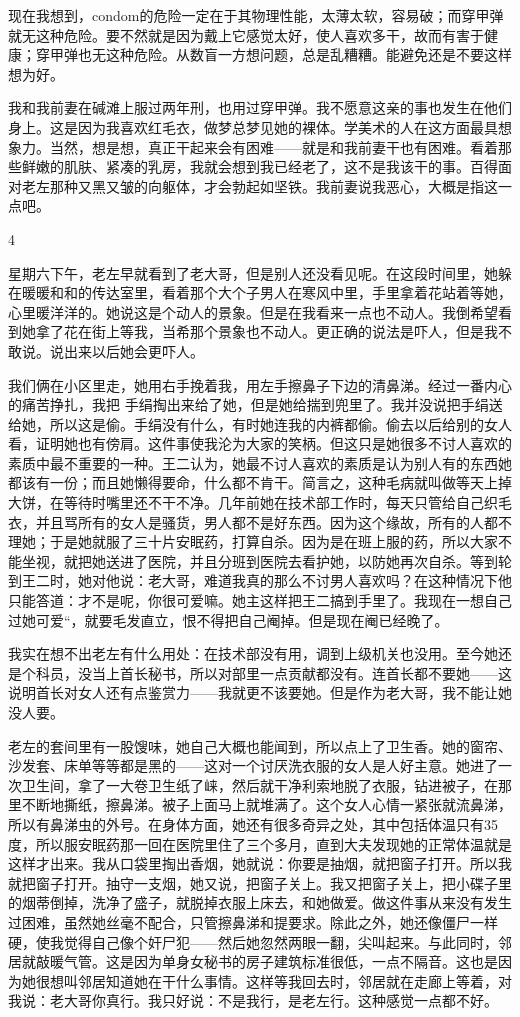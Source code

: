 现在我想到，condom的危险一定在于其物理性能，太薄太软，容易破；而穿甲弹就无这种危险。要不然就是因为戴上它感觉太好，使人喜欢多干，故而有害于健康；穿甲弹也无这种危险。从数盲一方想问题，总是乱糟糟。能避免还是不要这样想为好。 

我和我前妻在碱滩上服过两年刑，也用过穿甲弹。我不愿意这亲的事也发生在他们身上。这是因为我喜欢红毛衣，做梦总梦见她的裸体。学美术的人在这方面最具想象力。当然，想是想，真正干起来会有困难——就是和我前妻干也有困难。看着那些鲜嫩的肌肤、紧凑的乳房，我就会想到我已经老了，这不是我该干的事。百得面对老左那种又黑又皱的向躯体，才会勃起如坚铁。我前妻说我恶心，大概是指这一点吧。 



4 

星期六下午，老左早就看到了老大哥，但是别人还没看见呢。在这段时间里，她躲在暖暖和和的传达室里，看着那个大个子男人在寒风中里，手里拿着花站着等她，心里暖洋洋的。她说这是个动人的景象。但是在我看来一点也不动人。我倒希望看到她拿了花在街上等我，当希那个景象也不动人。更正确的说法是吓人，但是我不敢说。说出来以后她会更吓人。 

我们俩在小区里走，她用右手挽着我，用左手擦鼻子下边的清鼻涕。经过一番内心的痛苦挣扎，我把 手绢掏出来给了她，但是她给揣到兜里了。我并没说把手绢送给她，所以这是偷。手绢没有什么，有时她连我的内裤都偷。偷去以后给别的女人看，证明她也有傍肩。这件事使我沦为大家的笑柄。但这只是她很多不讨人喜欢的素质中最不重要的一种。王二认为，她最不讨人喜欢的素质是认为别人有的东西她都该有一份；而且她懒得要命，什么都不肯干。简言之，这种毛病就叫做等天上掉大饼，在等待时嘴里还不干不净。几年前她在技术部工作时，每天只管给自己织毛衣，并且骂所有的女人是骚货，男人都不是好东西。因为这个缘故，所有的人都不理她；于是她就服了三十片安眠药，打算自杀。因为是在班上服的药，所以大家不能坐视，就把她送进了医院，并且分班到医院去看护她，以防她再次自杀。等到轮到王二时，她对他说：老大哥，难道我真的那么不讨男人喜欢吗？在这种情况下他只能答道：才不是呢，你很可爱嘛。她主这样把王二搞到手里了。我现在一想自己过她可爱“，就要毛发直立，恨不得把自己阉掉。但是现在阉已经晚了。 

我实在想不出老左有什么用处：在技术部没有用，调到上级机关也没用。至今她还是个科员，没当上首长秘书，所以对部里一点贡献都没有。连首长都不要她——这说明首长对女人还有点鉴赏力——我就更不该要她。但是作为老大哥，我不能让她没人要。 

老左的套间里有一股馊味，她自己大概也能闻到，所以点上了卫生香。她的窗帘、沙发套、床单等等都是黑的——这对一个讨厌洗衣服的女人是人好主意。她进了一次卫生间，拿了一大卷卫生纸了崃，然后就干净利索地脱了衣服，钻进被子，在那里不断地撕纸，擦鼻涕。被子上面马上就堆满了。这个女人心情一紧张就流鼻涕，所以有鼻涕虫的外号。在身体方面，她还有很多奇异之处，其中包括体温只有35度，所以服安眠药那一回在医院里住了三个多月，直到大夫发现她的正常体温就是这样才出来。我从口袋里掏出香烟，她就说：你要是抽烟，就把窗子打开。所以我就把窗子打开。抽守一支烟，她又说，把窗子关上。我又把窗子关上，把小碟子里的烟蒂倒掉，洗净了盛子，就脱掉衣服上床去，和她做爱。做这件事从来没有发生过困难，虽然她丝毫不配合，只管擦鼻涕和提要求。除此之外，她还像僵尸一样硬，使我觉得自己像个奸尸犯——然后她忽然两眼一翻，尖叫起来。与此同时，邻居就敲暖气管。这是因为单身女秘书的房子建筑标准很低，一点不隔音。这也是因为她很想叫邻居知道她在干什么事情。这样等我回去时，邻居就在走廊上等着，对我说：老大哥你真行。我只好说：不是我行，是老左行。这种感觉一点都不好。 

